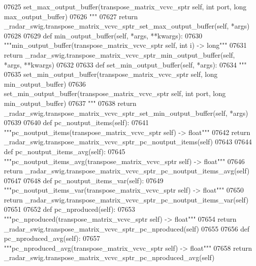 \begin{DoxyCode}
{{{{{{{{{{{{{{{{{{{{{{{{{07625 \textcolor{stringliteral}{        set\_max\_output\_buffer(transpose\_matrix\_vcvc\_sptr self, int port, long max\_output\_buffer)}
07626 \textcolor{stringliteral}{        """}
07627         \textcolor{keywordflow}{return} \_radar\_swig.transpose\_matrix\_vcvc\_sptr\_set\_max\_output\_buffer(self, *args)
07628 
07629     \textcolor{keyword}{def }min_output_buffer(self, *args, **kwargs):
07630         \textcolor{stringliteral}{"""min\_output\_buffer(transpose\_matrix\_vcvc\_sptr self, int i) -> long"""}
07631         \textcolor{keywordflow}{return} \_radar\_swig.transpose\_matrix\_vcvc\_sptr\_min\_output\_buffer(self, *args, **kwargs)
07632 
07633     \textcolor{keyword}{def }set_min_output_buffer(self, *args):
07634         \textcolor{stringliteral}{"""}
07635 \textcolor{stringliteral}{        set\_min\_output\_buffer(transpose\_matrix\_vcvc\_sptr self, long min\_output\_buffer)}
07636 \textcolor{stringliteral}{        set\_min\_output\_buffer(transpose\_matrix\_vcvc\_sptr self, int port, long min\_output\_buffer)}
07637 \textcolor{stringliteral}{        """}
07638         \textcolor{keywordflow}{return} \_radar\_swig.transpose\_matrix\_vcvc\_sptr\_set\_min\_output\_buffer(self, *args)
07639 
07640     \textcolor{keyword}{def }pc_noutput_items(self):
07641         \textcolor{stringliteral}{"""pc\_noutput\_items(transpose\_matrix\_vcvc\_sptr self) -> float"""}
07642         \textcolor{keywordflow}{return} \_radar\_swig.transpose\_matrix\_vcvc\_sptr\_pc\_noutput\_items(self)
07643 
07644     \textcolor{keyword}{def }pc_noutput_items_avg(self):
07645         \textcolor{stringliteral}{"""pc\_noutput\_items\_avg(transpose\_matrix\_vcvc\_sptr self) -> float"""}
07646         \textcolor{keywordflow}{return} \_radar\_swig.transpose\_matrix\_vcvc\_sptr\_pc\_noutput\_items\_avg(self)
07647 
07648     \textcolor{keyword}{def }pc_noutput_items_var(self):
07649         \textcolor{stringliteral}{"""pc\_noutput\_items\_var(transpose\_matrix\_vcvc\_sptr self) -> float"""}
07650         \textcolor{keywordflow}{return} \_radar\_swig.transpose\_matrix\_vcvc\_sptr\_pc\_noutput\_items\_var(self)
07651 
07652     \textcolor{keyword}{def }pc_nproduced(self):
07653         \textcolor{stringliteral}{"""pc\_nproduced(transpose\_matrix\_vcvc\_sptr self) -> float"""}
07654         \textcolor{keywordflow}{return} \_radar\_swig.transpose\_matrix\_vcvc\_sptr\_pc\_nproduced(self)
07655 
07656     \textcolor{keyword}{def }pc_nproduced_avg(self):
07657         \textcolor{stringliteral}{"""pc\_nproduced\_avg(transpose\_matrix\_vcvc\_sptr self) -> float"""}
07658         \textcolor{keywordflow}{return} \_radar\_swig.transpose\_matrix\_vcvc\_sptr\_pc\_nproduced\_avg(self)
}}}}}}}}}}}}}}}}}}}}}}}}}
\end{DoxyCode}
